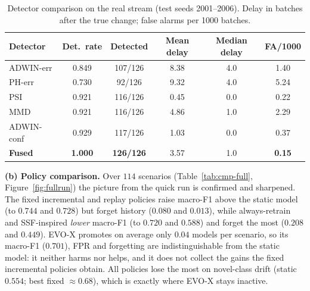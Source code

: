 \documentclass{article}
\begin{document}
\begin{table}[h]
\centering
\caption{Detector comparison on the real stream (test seeds 2001--2006). Delay in batches after the true change; false alarms per 1000 batches.}
\label{tab:det-full}
\small
\begin{tabular}{lccccc}
\toprule
Detector & Det.\ rate & Detected & Mean delay & Median delay & FA/1000 \\
\midrule
ADWIN-err  & 0.849 & 107/126 & 8.38 & 4.0 & 1.40 \\
PH-err     & 0.730 & 92/126  & 9.32 & 4.0 & 5.24 \\
PSI        & 0.921 & 116/126 & 0.45 & 0.0 & 0.22 \\
MMD        & 0.921 & 116/126 & 4.86 & 1.0 & 2.29 \\
ADWIN-conf & 0.929 & 117/126 & 1.03 & 0.0 & 0.37 \\
\textbf{Fused} & \textbf{1.000} & \textbf{126/126} & 3.57 & 1.0 & \textbf{0.15} \\
\bottomrule
\end{tabular}
\end{table}

\textbf{(b) Policy comparison.} Over $114$ scenarios (Table~\ref{tab:cmp-full}, Figure~\ref{fig:fullrun}) the picture from the quick run is confirmed and sharpened. The fixed incremental and replay policies raise macro-F1 above the static model (to $0.744$ and $0.728$) but forget history ($0.080$ and $0.013$), while always-retrain and SSF-inspired \emph{lower} macro-F1 (to $0.720$ and $0.588$) and forget the most ($0.208$ and $0.449$). EVO-X promotes on average only $0.04$ models per scenario, so its macro-F1 ($0.701$), FPR and forgetting are indistinguishable from the static model: it neither harms nor helps, and it does not collect the gains the fixed incremental policies obtain. All policies lose the most on novel-class drift (static $0.554$; best fixed $\approx0.68$), which is exactly where EVO-X stays inactive.
\end{document}
